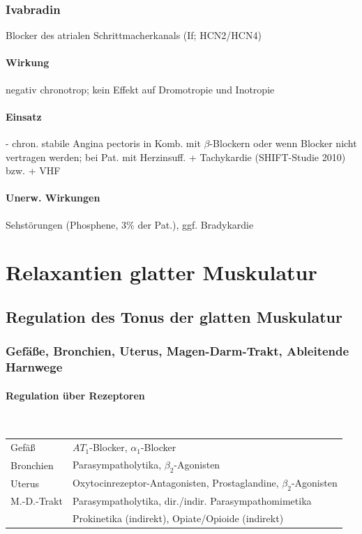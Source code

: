 \documentclass[10pt,a4paper]{report}
\begin{document}
\subsubsection{Ivabradin} Blocker des atrialen Schrittmacherkanals (If; HCN2/HCN4)
\paragraph{Wirkung} negativ chronotrop; kein Effekt auf Dromotropie und Inotropie
\paragraph{Einsatz}  - chron. stabile Angina pectoris in Komb. mit $\beta$-Blockern oder wenn Blocker nicht vertragen werden; bei Pat. mit Herzinsuff. + Tachykardie (SHIFT-Studie 2010) bzw. + VHF
\paragraph{Unerw. Wirkungen} Sehstörungen (Phosphene, 3\% der Pat.), ggf. Bradykardie
\section{Relaxantien glatter Muskulatur}
\subsection{Regulation des Tonus der glatten Muskulatur}
\subsubsection{Gefäße, Bronchien, Uterus, Magen-Darm-Trakt, Ableitende Harnwege}
\paragraph{Regulation über Rezeptoren} \mbox{} \\

\begin{tabularx}{\textwidth}{XX}
Gefäß&$AT_1$-Blocker, $\alpha_1$-Blocker\\
Bronchien&Parasympatholytika, $\beta_2$-Agonisten\\
Uterus&Oxytocinrezeptor-Antagonisten, Prostaglandine, $\beta_2$-Agonisten\\ 
M.-D.-Trakt&Parasympatholytika, dir./indir. Parasympathomimetika\\
&Prokinetika (indirekt), Opiate/Opioide (indirekt)\\
\end{tabularx}
\end{document}
